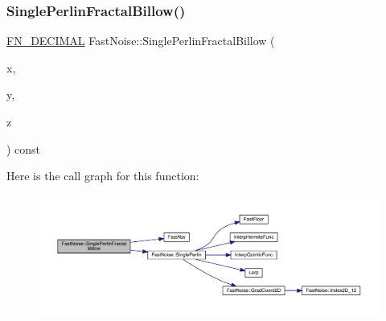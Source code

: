 \subsubsection{\texorpdfstring{Single\+Perlin\+Fractal\+Billow()}{SinglePerlinFractalBillow()}\hspace{0.1cm}{\footnotesize\ttfamily [2/2]}}
{\footnotesize\ttfamily \mbox{\hyperlink{_fast_noise_8h_a75a9ef6d2541c4921815b885bfd449c3}{F\+N\+\_\+\+D\+E\+C\+I\+M\+AL}} Fast\+Noise\+::\+Single\+Perlin\+Fractal\+Billow (\begin{DoxyParamCaption}\item[{\mbox{\hyperlink{_fast_noise_8h_a75a9ef6d2541c4921815b885bfd449c3}{F\+N\+\_\+\+D\+E\+C\+I\+M\+AL}}}]{x,  }\item[{\mbox{\hyperlink{_fast_noise_8h_a75a9ef6d2541c4921815b885bfd449c3}{F\+N\+\_\+\+D\+E\+C\+I\+M\+AL}}}]{y,  }\item[{\mbox{\hyperlink{_fast_noise_8h_a75a9ef6d2541c4921815b885bfd449c3}{F\+N\+\_\+\+D\+E\+C\+I\+M\+AL}}}]{z }\end{DoxyParamCaption}) const\hspace{0.3cm}{\ttfamily [private]}}

Here is the call graph for this function\+:
\nopagebreak
\begin{figure}[H]
\begin{center}
\leavevmode
\includegraphics[width=350pt]{d1/dd8/class_fast_noise_a4e99adf451ddbd11a425a0909b2ae7e1_cgraph}
\end{center}
\end{figure}
\mbox{\label{class_fast_noise_a6f38e0737ecab4f680e41936f5381141}} 
